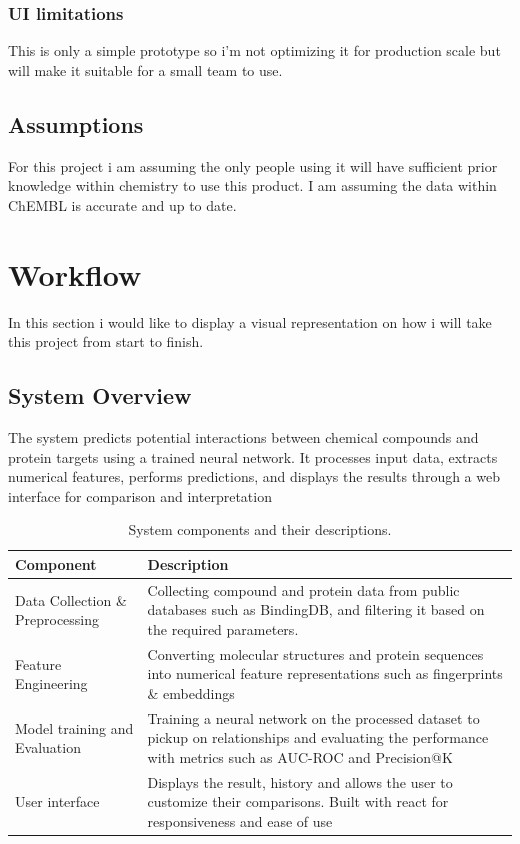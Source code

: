 \subsubsection{UI limitations} 
This is only a simple prototype so i'm not optimizing it for production scale but will make it suitable for a small team to use.
\subsection{Assumptions}
For this project i am assuming the only people using it will have sufficient prior knowledge within chemistry to use this product. I am assuming the data within ChEMBL is accurate and up to date.

\section{Workflow}
In this section i would like to display a visual representation on how i will take this project from start to finish.
\subsection{System Overview}
The system predicts potential interactions between chemical compounds and protein targets using a trained neural network. It processes input data, extracts numerical features, performs predictions, and displays the results through a web interface for comparison and interpretation
\begin{table}[h!]
    \centering
    \begin{tabular}{@{}lp{10cm}@{}}
    \toprule
    \textbf{Component} & \textbf{Description} \\
    \midrule
    Data Collection \& Preprocessing & Collecting compound and protein data from public databases such as BindingDB, and filtering it based on the required parameters. \\
    \addlinespace
    \midrule
    Feature Engineering & Converting molecular structures and protein sequences into numerical feature representations such as fingerprints \& embeddings \\
    \addlinespace
    \midrule
    Model training and Evaluation & Training a neural network on the processed dataset to pickup on relationships and evaluating the performance with metrics such as AUC-ROC and Precision@K \\
    \addlinespace
    \midrule
    User interface & Displays the result, history and allows the user to customize their comparisons. Built with react for responsiveness and ease of use \\
    \bottomrule
    \end{tabular}
    \caption{System components and their descriptions.}
    \label{tab:system_components}
\end{table}
